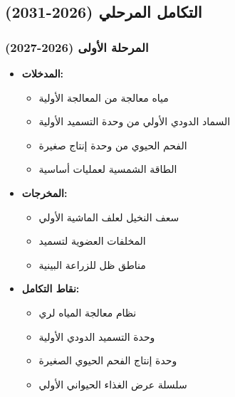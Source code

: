 \subsection{التكامل المرحلي (2026-2031)}

\subsubsection{المرحلة الأولى (2026-2027)}
\begin{itemize}
    \item \textbf{المدخلات:}
    \begin{itemize}
        \item مياه معالجة من المعالجة الأولية
        \item السماد الدودي الأولي من وحدة التسميد الأولية
        \item الفحم الحيوي من وحدة إنتاج صغيرة
        \item الطاقة الشمسية لعمليات أساسية
    \end{itemize}
    \item \textbf{المخرجات:}
    \begin{itemize}
        \item سعف النخيل لعلف الماشية الأولي
        \item المخلفات العضوية لتسميد
        \item مناطق ظل للزراعة البينية
    \end{itemize}
    \item \textbf{نقاط التكامل:}
    \begin{itemize}
        \item نظام معالجة المياه لري
        \item وحدة التسميد الدودي الأولية
        \item وحدة إنتاج الفحم الحيوي الصغيرة
        \item سلسلة عرض الغذاء الحيواني الأولي
    \end{itemize}
\end{itemize}

